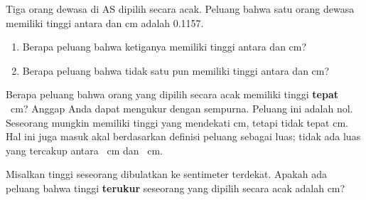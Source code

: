 \begin{exercisewrap}
\begin{nexercise}
Tiga orang dewasa di AS dipilih secara acak. Peluang bahwa satu orang dewasa memiliki tinggi antara  dan  cm adalah 0.1157.\footnotemark\vspace{-1.5mm}
\begin{enumerate}
\setlength{\itemsep}{0mm}
\item[(a)] Berapa peluang bahwa ketiganya memiliki tinggi antara  dan  cm?
\item[(b)] Berapa peluang bahwa tidak satu pun memiliki tinggi antara  dan  cm?
\end{enumerate}
\end{nexercise}
\end{exercisewrap}

\begin{examplewrap}
\begin{nexample}{Berapa peluang bahwa orang yang dipilih secara acak memiliki tinggi \textbf{tepat} ~cm? Anggap Anda dapat mengukur dengan sempurna.}
\label{probabilityOfExactly180cm}
Peluang ini adalah nol. Seseorang mungkin memiliki tinggi yang mendekati  cm, tetapi tidak tepat  cm. Hal ini juga masuk akal berdasarkan definisi peluang sebagai luas; tidak ada luas yang tercakup antara ~cm dan ~cm.
\end{nexample}
\end{examplewrap}

\begin{exercisewrap}
\begin{nexercise}
Misalkan tinggi seseorang dibulatkan ke sentimeter terdekat. Apakah ada peluang bahwa tinggi \textbf{terukur} seseorang yang dipilih secara acak adalah  cm?\footnotemark
\end{nexercise}
\end{exercisewrap}



{}
